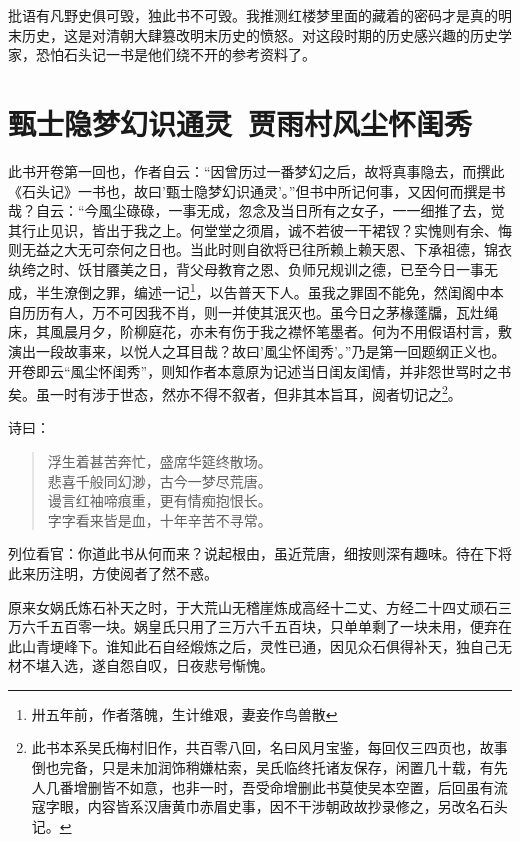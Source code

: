 \documentclass[12pt,oneside]{book}
\newenvironment{shici}{%
\begin{verse}%
\centering\large\hspace{12pt}}%
{\end{verse}}
\begin{document}
批语有凡野史俱可毁，独此书不可毁。我推测红楼梦里面的藏着的密码才是真的明末历史，这是对清朝大肆篡改明末历史的愤怒。对这段时期的历史感兴趣的历史学家，恐怕石头记一书是他们绕不开的参考资料了。




\setcounter{tocdepth}{2}    
\tableofcontents



\mainmatter


\chapter{甄士隐梦幻识通灵~贾雨村风尘怀闺秀}
此书开卷第一回也，作者自云：“因曾历过一番梦幻之后，故将真事隐去，而撰此《石头记》一书也，故曰’甄士隐梦幻识通灵’。”但书中所记何事，又因何而撰是书哉？自云：“今風尘碌碌，一事无成，忽念及当日所有之女子，一一细推了去，觉其行止见识，皆出于我之上。何堂堂之须眉，诚不若彼一干裙钗？实愧则有余、悔则无益之大无可奈何之日也。当此时则自欲将已往所赖上赖天恩、下承祖德，锦衣纨绔之时、饫甘餍美之日，背父母教育之恩、负师兄规训之德，已至今日一事无成，半生潦倒之罪，编述一记\footnote{卅五年前，作者落魄，生计维艰，妻妾作鸟兽散}，以告普天下人。虽我之罪固不能免，然闺阁中本自历历有人，万不可因我不肖，则一并使其泯灭也。虽今日之茅椽蓬牖，瓦灶绳床，其風晨月夕，阶柳庭花，亦未有伤于我之襟怀笔墨者。何为不用假语村言，敷演出一段故事来，以悦人之耳目哉？故曰’風尘怀闺秀’。”乃是第一回题纲正义也。开卷即云“風尘怀闺秀”，则知作者本意原为记述当日闺友闺情，并非怨世骂时之书矣。虽一时有涉于世态，然亦不得不叙者，但非其本旨耳，阅者切记之\footnote{此书本系吴氏梅村旧作，共百零八回，名曰风月宝鉴，每回仅三四页也，故事倒也完备，只是未加润饰稍嫌枯索，吴氏临终托诸友保存，闲置几十载，有先人几番增删皆不如意，也非一时，吾受命增删此书莫使吴本空置，后回虽有流寇字眼，内容皆系汉唐黄巾赤眉史事，因不干涉朝政故抄录修之，另改名石头记。}。

诗曰：

\begin{shici}
浮生着甚苦奔忙，盛席华筵终散场。\\
悲喜千般同幻渺，古今一梦尽荒唐。\\
谩言红袖啼痕重，更有情痴抱恨长。\\
字字看来皆是血，十年辛苦不寻常。
\end{shici}


列位看官：你道此书从何而来？说起根由，虽近荒唐，细按则深有趣味。待在下将此来历注明，方使阅者了然不惑。

原来女娲氏炼石补天之时，于大荒山无稽崖炼成高经十二丈、方经二十四丈顽石三万六千五百零一块。娲皇氏只用了三万六千五百块，只单单剩了一块未用，便弃在此山青埂峰下。谁知此石自经煅炼之后，灵性已通，因见众石俱得补天，独自己无材不堪入选，遂自怨自叹，日夜悲号惭愧。
\end{document}

